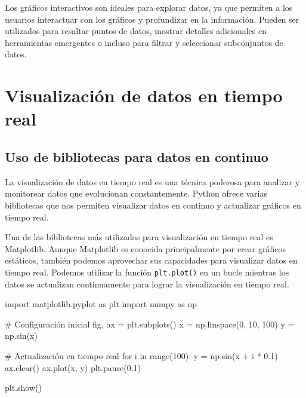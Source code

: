 \documentclass[
  a4paper,
]{article}
\newenvironment{Shaded}{}{}
\newcommand{\BuiltInTok}[1]{\textcolor[rgb]{0.84,0.23,0.29}{#1}}
\newcommand{\CommentTok}[1]{\textcolor[rgb]{0.42,0.45,0.49}{#1}}
\newcommand{\ControlFlowTok}[1]{\textcolor[rgb]{0.84,0.23,0.29}{#1}}
\newcommand{\DecValTok}[1]{\textcolor[rgb]{0.00,0.36,0.77}{#1}}
\newcommand{\FloatTok}[1]{\textcolor[rgb]{0.00,0.36,0.77}{#1}}
\newcommand{\ImportTok}[1]{\textcolor[rgb]{0.01,0.18,0.38}{#1}}
\newcommand{\KeywordTok}[1]{\textcolor[rgb]{0.84,0.23,0.29}{#1}}
\newcommand{\NormalTok}[1]{\textcolor[rgb]{0.14,0.16,0.18}{#1}}
\newcommand{\OperatorTok}[1]{\textcolor[rgb]{0.14,0.16,0.18}{#1}}
\begin{document}
Los gráficos interactivos son ideales para explorar datos, ya que
permiten a los usuarios interactuar con los gráficos y profundizar en la
información. Pueden ser utilizados para resaltar puntos de datos,
mostrar detalles adicionales en herramientas emergentes o incluso para
filtrar y seleccionar subconjuntos de datos.

\hypertarget{visualizaciuxf3n-de-datos-en-tiempo-real}{%
\section{Visualización de datos en tiempo
real}\label{visualizaciuxf3n-de-datos-en-tiempo-real}}

\hypertarget{uso-de-bibliotecas-para-datos-en-continuo}{%
\subsection{Uso de bibliotecas para datos en
continuo}\label{uso-de-bibliotecas-para-datos-en-continuo}}

La visualización de datos en tiempo real es una técnica poderosa para
analizar y monitorear datos que evolucionan constantemente. Python
ofrece varias bibliotecas que nos permiten visualizar datos en continuo
y actualizar gráficos en tiempo real.

Una de las bibliotecas más utilizadas para visualización en tiempo real
es Matplotlib. Aunque Matplotlib es conocida principalmente por crear
gráficos estáticos, también podemos aprovechar sus capacidades para
visualizar datos en tiempo real. Podemos utilizar la función
\texttt{plt.plot()} en un bucle mientras los datos se actualizan
continuamente para lograr la visualización en tiempo real.

\begin{Shaded}
\begin{Highlighting}[]
\ImportTok{import}\NormalTok{ matplotlib.pyplot }\ImportTok{as}\NormalTok{ plt}
\ImportTok{import}\NormalTok{ numpy }\ImportTok{as}\NormalTok{ np}

\CommentTok{\# Configuración inicial}
\NormalTok{fig, ax }\OperatorTok{=}\NormalTok{ plt.subplots()}
\NormalTok{x }\OperatorTok{=}\NormalTok{ np.linspace(}\DecValTok{0}\NormalTok{, }\DecValTok{10}\NormalTok{, }\DecValTok{100}\NormalTok{)}
\NormalTok{y }\OperatorTok{=}\NormalTok{ np.sin(x)}

\CommentTok{\# Actualización en tiempo real}
\ControlFlowTok{for}\NormalTok{ i }\KeywordTok{in} \BuiltInTok{range}\NormalTok{(}\DecValTok{100}\NormalTok{):}
\NormalTok{    y }\OperatorTok{=}\NormalTok{ np.sin(x }\OperatorTok{+}\NormalTok{ i }\OperatorTok{*} \FloatTok{0.1}\NormalTok{)}
\NormalTok{    ax.clear()}
\NormalTok{    ax.plot(x, y)}
\NormalTok{    plt.pause(}\FloatTok{0.1}\NormalTok{)}

\NormalTok{plt.show()}
\end{Highlighting}
\end{Shaded}
\end{document}
